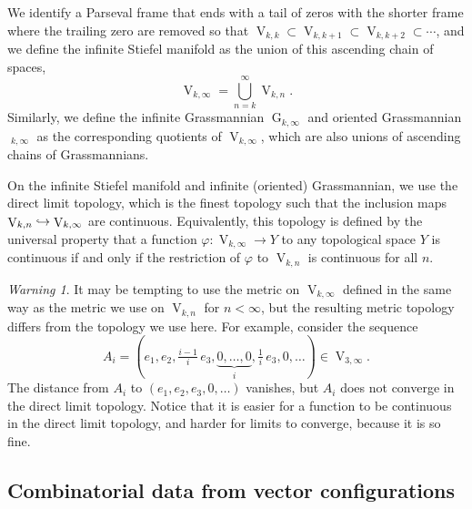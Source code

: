 \documentclass[JEP,XML,SOM,Unicode,NoFloatCountersInSection,published]{cedram}
\newcommand\hto{\mathrel{\lhook\joinrel\to}}
\theoremstyle{remark}
\newtheorem{warning}[theorem]{Warning}
\let\phi\varphi
\DeclareMathOperator{\g}{G}
\DeclareMathOperator{\oG}{\widetilde G}
\DeclareMathOperator{\stief}{V}
\begin{document}
We identify a Parseval frame that ends with a tail of zeros with the shorter frame where the trailing zero are removed so that $\stief_{k,k} \subset \stief_{k,k+1} \subset \stief_{k,k+2} \subset \cdots$,
and we define the infinite Stiefel manifold as the union of this ascending chain of spaces,
\[ \stief_{k,\infty} = \bigcup_{n=k}^\infty \stief_{k,n}. \]
Similarly, we define the infinite Grassmannian $\g_{k,\infty}$ and oriented Grassmannian $\oG_{k,\infty}$ as the corresponding quotients of $\stief_{k,\infty}$, which are also unions of ascending chains of Grassmannians.

On the infinite Stiefel manifold and infinite (oriented) Grassmannian, we use the direct limit topology, which is the finest topology such that the inclusion maps \hbox{$\stief_{k,n} \hto \stief_{k,\infty}$} are continuous.
Equivalently, this topology is defined by the universal property that a function $\phi : \stief_{k,\infty} \to Y$ to any topological space $Y$ is continuous if and only if the restriction of $\phi$ to $\stief_{k,n}$ is continuous for all $n$.

\begin{warning}
It may be tempting to use the metric on $\stief_{k,\infty}$ defined in the same way as the metric we use on $\stief_{k,n}$ for $n<\infty$, but the resulting metric topology differs from the topology we use here.
For example, consider the sequence
\[A_i = (e_1,e_2,\tfrac{i-1}{i}\,e_3,\underbrace{0,\dots,0}_i,\tfrac{1}{i}\,e_3,0,\dots) \in \stief_{3,\infty}. \]
The distance from $A_i$ to $(e_1,e_2,e_3,0,\dots)$ vanishes, but $A_i$ does not converge in the direct limit topology.
Notice that it is easier for a function to be continuous in the direct limit topology, and harder for limits to converge, because it is so fine.
\end{warning}

\subsection{Combinatorial data from vector configurations}\label{subsection-combinatorial-data}
\end{document}
